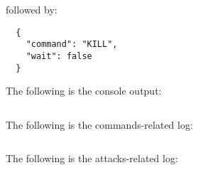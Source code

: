 followed by:

\begin{verbatim}
  {
    "command": "KILL",
    "wait": false
  }
\end{verbatim}

The following is the console output:

\begin{verbatim}

\end{verbatim}

The following is the commands-related log:

\begin{verbatim}

\end{verbatim}

The following is the attacks-related log:

\begin{verbatim}

\end{verbatim}
